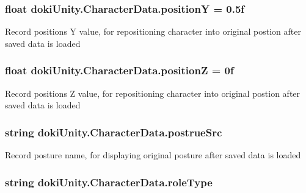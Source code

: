 \subsubsection[{\texorpdfstring{positionY}{positionY}}]{\setlength{\rightskip}{0pt plus 5cm}float doki\+Unity.\+Character\+Data.\+positionY = 0.\+5f}\hypertarget{classdoki_unity_1_1_character_data_a737106f39a00a47969ef0eb9bc9ca687}{}\label{classdoki_unity_1_1_character_data_a737106f39a00a47969ef0eb9bc9ca687}


Record position\textquotesingle{}s Y value, for repositioning character into original postion after saved data is loaded 

\subsubsection[{\texorpdfstring{positionZ}{positionZ}}]{\setlength{\rightskip}{0pt plus 5cm}float doki\+Unity.\+Character\+Data.\+positionZ = 0f}\hypertarget{classdoki_unity_1_1_character_data_a63d642bed2b900c80aa6d303782085e9}{}\label{classdoki_unity_1_1_character_data_a63d642bed2b900c80aa6d303782085e9}


Record position\textquotesingle{}s Z value, for repositioning character into original postion after saved data is loaded 

\subsubsection[{\texorpdfstring{postrue\+Src}{postrueSrc}}]{\setlength{\rightskip}{0pt plus 5cm}string doki\+Unity.\+Character\+Data.\+postrue\+Src}\hypertarget{classdoki_unity_1_1_character_data_a52723e156c7c0698a415fa683a3006ce}{}\label{classdoki_unity_1_1_character_data_a52723e156c7c0698a415fa683a3006ce}


Record posture name, for displaying original posture after saved data is loaded 

\subsubsection[{\texorpdfstring{role\+Type}{roleType}}]{\setlength{\rightskip}{0pt plus 5cm}string doki\+Unity.\+Character\+Data.\+role\+Type}\hypertarget{classdoki_unity_1_1_character_data_ae1ad2cd46972669b421f3d6904346272}{}\label{classdoki_unity_1_1_character_data_ae1ad2cd46972669b421f3d6904346272}


